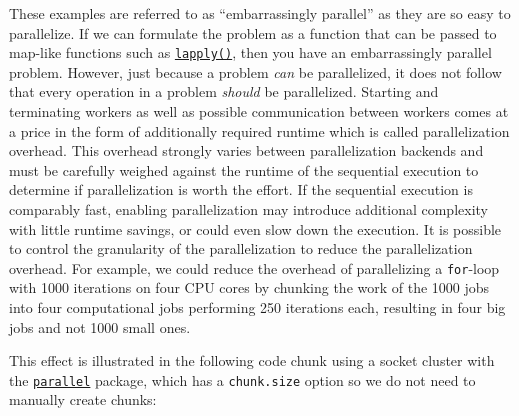These examples are referred to as ``embarrassingly
parallel'' as they are so easy to parallelize. If we
can formulate the problem as a function that can be passed to map-like
functions such as
\href{https://www.rdocumentation.org/packages/base/topics/lapply}{\texttt{lapply()}},
then you have an embarrassingly parallel problem. However, just because
a problem \emph{can} be parallelized, it does not follow that every
operation in a problem \emph{should} be parallelized. Starting and
terminating workers as well as possible communication between workers
comes at a price in the form of additionally required runtime which is
called parallelization
overhead. This overhead strongly varies between
parallelization backends and must be carefully weighed against the
runtime of the sequential execution to determine if parallelization is
worth the effort. If the sequential execution is comparably fast,
enabling parallelization may introduce additional complexity with little
runtime savings, or could even slow down the execution. It is possible
to control the
granularity
of the parallelization to reduce the parallelization overhead. For
example, we could reduce the overhead of parallelizing a
\texttt{for}-loop with 1000 iterations on four CPU cores by
chunking the work of the 1000 jobs into four
computational jobs performing 250 iterations each, resulting in four big
jobs and not 1000 small ones.

This effect is illustrated in the following code chunk using a socket
cluster with the
\href{https://cran.r-project.org/package=parallel}{\texttt{parallel}}
package, which has a \texttt{chunk.size} option so we do not need to
manually create chunks:

